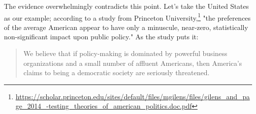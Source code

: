 The evidence overwhelmingly contradicts this point.
Let's take the United States as our example; according to a study from Princeton University,\footnote{\href{https://scholar.princeton.edu/sites/default/files/mgilens/files/gilens_and_page_2014_-testing_theories_of_american_politics.doc.pdf}{https://scholar.princeton.edu/sites/default/files/mgilens/files/gilens\_and\_page\_2014\_-testing\_theories\_of\_american\_politics.doc.pdf}} "the preferences of the average American appear to have only a minuscule, near-zero, statistically non-significant impact upon public policy."
As the study puts it:
\begin{quote}
We believe that if policy-making is dominated by powerful business organizations and a small number of affluent Americans, then America’s claims to being a democratic society are seriously threatened.
\end{quote}
%
%
%
%
%
%
